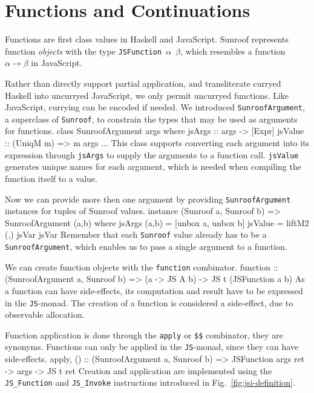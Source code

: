 \documentclass{llncs}
\newcommand{\Src}[1]{{\tt{#1}}}
\newcommand{\JS}{\Src{JS}}
\newenvironment{Code}{\verbatim}{\endverbatim}
\newcommand{\FigRef}[1]{Fig.~\ref{#1}}
\begin{document}
\section{Functions and Continuations}
\label{sec:functions-continuations}

Functions are first class values in Haskell and JavaScript.
Sunroof represents function {\em objects\/} with the type 
\Src{JSFunction $\alpha$ $\beta$}, which resembles 
a function $\alpha \rightarrow \beta$ in JavaScript.


Rather than directly support partial application,
and transliterate curryed Haskell into uncurryed JavaScript,
we only permit uncurryed functions.
Like JavaScript, currying can be encoded if needed.
We introduced \Src{SunroofArgument},
a superclass of \Src{Sunroof}, to constrain the 
types that may be used as arguments for functions.
\begin{Code}
class SunroofArgument args where
  jsArgs   :: args -> [Expr]
  jsValue  :: (UniqM m) => m args
  ...
\end{Code}
This class supports converting each argument into its expression
through \Src{jsArgs} to supply the
arguments to a function call. \Src{jsValue} generates
unique names for each argument, which is needed when compiling
the function itself to a value. 

Now we can provide more then one argument
by providing \Src{SunroofArgument} instances for tuples of Sunroof values.
\begin{Code}
instance (Sunroof a, Sunroof b) => SunroofArgument (a,b) where
  jsArgs (a,b) = [unbox a, unbox b]
  jsValue = liftM2 (,) jsVar jsVar
\end{Code}
Remember that each \Src{Sunroof} value already has to be 
a \Src{SunroofArgument}, which enables us to pass a single argument
to a function. 

We can create function objects with the \Src{function} combinator.
\begin{Code}
function :: (SunroofArgument a, Sunroof b) 
         => (a -> JS A b)  -> JS t (JSFunction a b)
\end{Code}
As a function can have side-effects, its computation and result have to be 
expressed in the \JS-monad. The creation of a function is considered 
a side-effect, due to observable allocation.

Function application is done through 
the \Src{apply} or \Src{\$\$} combinator, they are synonyms.
Functions can only be applied in the \JS-monad, since they can have side-effects.
\begin{Code}
apply, ($$) :: (SunroofArgument a, Sunroof b) 
            => JSFunction args ret -> args -> JS t ret
\end{Code}
Creation and application are implemented using the \Src{JS\_Function}
and \Src{JS\_Invoke} instructions introduced in 
\FigRef{fig:jsi-definition}.
\end{document}
